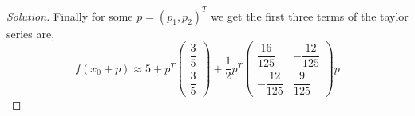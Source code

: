 \documentclass[12pt]{article}
\makeatletter
\theoremstyle{homework}
\newenvironment{exercise}[1]
{\def\@currentlabel{#1}\exercisecore}
{\endexercisecore}
\makeatother
\begin{document}
\begin{exercise}{6.5}
\begin{proof}[Solution]
    Finally for some $p = (p_1, p_2)^T$ we get the first three terms of the taylor series are, 
    \begin{equation*}
      f(x_0 + p) \approx 5 + p^T
      \begin{pmatrix}
        \dfrac{3}{5}\\[10pt]
        \dfrac{3}{5}
      \end{pmatrix}
      + \dfrac{1}{2}
      p^{T}
      \begin{pmatrix}
        \dfrac{16}{125}& -\dfrac{12}{125}\\[10pt]
        -\dfrac{12}{125} & \dfrac{9}{125}
      \end{pmatrix}
      p
    \end{equation*}
  \end{proof}
\end{exercise}
\vspace{.5in}
\end{document}
